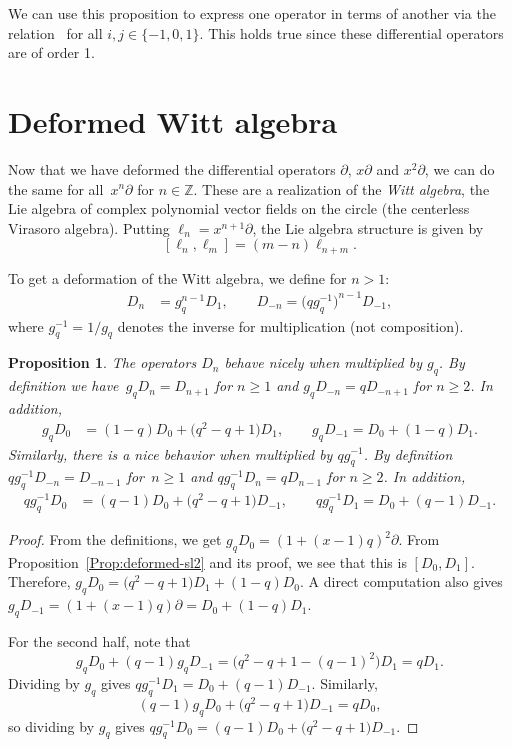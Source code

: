 \documentclass[pdftex]{sigma}
\numberwithin{equation}{section}
\newtheorem{Proposition}[Theorem]{Proposition}
 { \theoremstyle{definition}
\newtheorem{Definition}[Theorem]{Definition}
\newtheorem{Note}[Theorem]{Note}
\newtheorem{Example}[Theorem]{Example}
\newtheorem{Remark}[Theorem]{Remark} }
\newcommand*{\Z}{\mathbb{Z}}
\begin{document}
We can use this proposition to express one operator in terms of another via the relation~
for all $i,j\in \{-1,0,1\}$. This holds true since these differential operators are of order 1.


\section{Deformed Witt algebra}\label{Sec:Witt}

Now that we have deformed the differential operators $\partial$, $x\partial$ and $x^2\partial$, we can do the same for all~$x^n\partial$ for $n\in\Z$. These are a realization of the \emph{Witt algebra}, the Lie algebra of complex polynomial vector fields on the circle (the centerless Virasoro algebra). Putting $\ell_n=x^{n+1}\partial$, the Lie algebra structure is given by
\[\label{Eq-witt-algebra}
[\ell_n,\ell_m]=(m-n)\ell_{n+m}.
\]

To get a deformation of the Witt algebra, we define for $n>1$:
\begin{align*}
D_n &= g_q^{n-1}D_1, \qquad
D_{-n} = \big(qg_q^{-1}\big)^{n-1}D_{-1},
\end{align*}
where $g_q^{-1}=1/g_q$ denotes the inverse for multiplication (not composition).

\begin{Proposition}\label{Prop:mult-by-gq}
The operators $D_n$ behave nicely when multiplied by $g_q$. By definition we have~${g_qD_n=D_{n+1}}$ for $n\geq 1$ and $g_qD_{-n}=qD_{-n+1}$ for $n\geq 2$. In addition,
\begin{align*}
g_qD_0 &= (1-q)D_0+\big(q^2-q+1\big)D_1,\qquad
g_qD_{-1}= D_0+(1-q)D_1.
\end{align*}
Similarly, there is a nice behavior when multiplied by $qg_q^{-1}$. By definition $qg_q^{-1}D_{-n}=D_{-n-1}$ for~${n\geq 1}$ and $qg_q^{-1}D_n=qD_{n-1}$ for $n\geq 2$. In addition,
\begin{align*}
qg_q^{-1}D_0 &= (q-1)D_0+\big(q^2-q+1\big)D_{-1},\qquad
qg_q^{-1}D_{1}= D_0+(q-1)D_{-1}.
\end{align*}
\end{Proposition}
\begin{proof}
From the definitions, we get $g_qD_0=(1+(x-1)q)^2\partial$. From Proposition~\ref{Prop:deformed-sl2} and its proof, we see that this is $[D_0,D_1]$. Therefore, $g_qD_0=\big(q^2-q+1\big)D_1+(1-q)D_0$. A direct computation also gives $g_qD_{-1}=(1+(x-1)q)\partial=D_0+(1-q)D_1$.

For the second half, note that
\[
g_qD_0+(q-1)g_qD_{-1}=\big(q^2-q+1-(q-1)^2\big)D_1=qD_1.
\]
 Dividing by $g_q$ gives $qg_q^{-1}D_1=D_0+(q-1)D_{-1}$. Similarly,
 \[
 (q-1)g_qD_0+\big(q^2-q+1\big)D_{-1}=qD_0,\] so dividing by $g_q$ gives $qg_q^{-1}D_0=(q-1)D_0+\big(q^2-q+1\big)D_{-1}$.
\end{proof}
\end{document}
